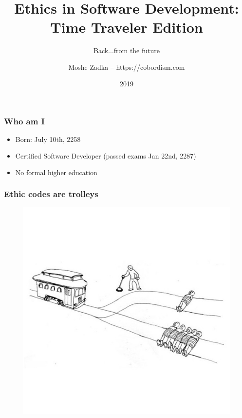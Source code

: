 \usepackage{graphicx}
\usepackage{listings}
\usepackage{textcomp}
\usepackage{fancyvrb}

\title{Ethics in Software Development: Time Traveler Edition}
\subtitle{Back...from the future}
\author{Moshe Zadka -- https://cobordism.com}
\date{2019}


\begin{titlepage}
\maketitle
\end{titlepage}

\frame{\titlepage}

\begin{frame}[fragile]
\frametitle{Who am I}

\begin{itemize}
\item Born: July 10th, 2258
\item Certified Software Developer (passed exams Jan 22nd, 2287)
\item No formal higher education
\end{itemize}

\end{frame}

\begin{frame}[fragile]
\frametitle{Ethic codes are trolleys}

\begin{figure}
\includegraphics[scale=0.25]{trolley}
\end{figure}

\end{frame}

